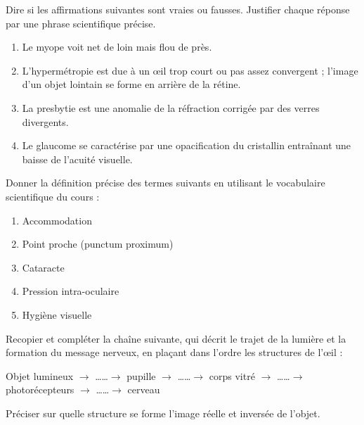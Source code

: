 \documentclass[11pt]{article}
\newcounter{popsec}
\newcounter{popsub}
\newcommand{\courssub}[1]{%
  \stepcounter{popsub}%
  \par\vspace{9pt}\noindent{\popxbold\fontsize{11.5}{13}\selectfont\color{popink}{\color{poporange}\thepopsec.\thepopsub}\hspace{6pt}#1}\par\nopagebreak\vspace{4pt}
}
\begin{document}
\begin{exercice}
Dire si les affirmations suivantes sont vraies ou fausses. Justifier chaque réponse par une phrase scientifique précise.
\begin{enumerate}
\item Le myope voit net de loin mais flou de près.
\item L'hypermétropie est due à un œil trop court ou pas assez convergent ; l'image d'un objet lointain se forme en arrière de la rétine.
\item La presbytie est une anomalie de la réfraction corrigée par des verres divergents.
\item Le glaucome se caractérise par une opacification du cristallin entraînant une baisse de l'acuité visuelle.
\end{enumerate}
\end{exercice}

\begin{exercice}
Donner la définition précise des termes suivants en utilisant le vocabulaire scientifique du cours :
\begin{enumerate}
\item Accommodation
\item Point proche (punctum proximum)
\item Cataracte
\item Pression intra-oculaire
\item Hygiène visuelle
\end{enumerate}
\end{exercice}

\begin{exercice}
Recopier et compléter la chaîne suivante, qui décrit le trajet de la lumière et la formation du message nerveux, en plaçant dans l'ordre les structures de l'œil :
\begin{center}
Objet lumineux $\rightarrow$ \ldots\ldots $\rightarrow$ pupille $\rightarrow$ \ldots\ldots $\rightarrow$ corps vitré $\rightarrow$ \ldots\ldots $\rightarrow$ photorécepteurs $\rightarrow$ \ldots\ldots $\rightarrow$ cerveau
\end{center}
Préciser sur quelle structure se forme l'image réelle et inversée de l'objet.
\end{exercice}

\courssub{Je m'entraîne}
\end{document}
